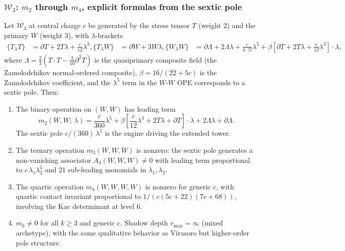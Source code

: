 \subsubsection{$\mathcal{W}_3$: $m_2$ through $m_4$,
explicit formulas from the sextic pole}

\begin{theorem}
Let $\mathcal{W}_3$ at central charge $c$ be generated by
the stress tensor $T$ (weight $2$) and the primary $W$
(weight $3$), with $\lambda$-brackets
\begin{align}
\{T{}_\lambda T\}
&= \partial T + 2T\lambda + \frac{c}{12}\lambda^3,
\{T{}_\lambda W\}
&= \partial W + 3W\lambda,
\{W{}_\lambda W\}
&= \partial\Lambda + 2\Lambda\lambda + \frac{c}{3\cdot 5!}\lambda^5
+ \beta\!\left[\partial T + 2T\lambda +
\frac{c}{12}\lambda^3\right] \cdot \lambda,
\end{align}
where $\Lambda = \frac{2}{3}(T \cdot T - \frac{3}{10}\partial^2 T)$
is the quasiprimary composite field (the Zamolodchikov
normal-ordered composite), $\beta = 16/(22 + 5c)$ is the
Zamolodchikov coefficient, and the $\lambda^5$ term in the
$W$-$W$ OPE corresponds to a sextic pole.
Then:
\begin{enumerate}[label=\textup{(\roman*)}]
\item The binary operation on $(W, W)$ has leading
term
\begin{equation}%
m_2(W,W;\, \lambda)
= \frac{c}{360}\lambda^5
+ \beta\!\left[\frac{c}{12}\lambda^3 + 2T\lambda
+ \partial T\right] \cdot \lambda
+ 2\Lambda\lambda + \partial\Lambda.
\end{equation}
The sextic pole $c/(360)\,\lambda^5$ is the
engine driving the extended tower.

\item The ternary operation $m_3(W,W,W)$ is nonzero:
the sextic pole generates a non-vanishing associator
$A_3(W,W,W) \ne 0$ with leading term proportional
to $c\,\lambda_1\lambda_2^5$ and $21$ sub-leading
monomials in $\lambda_1, \lambda_2$.

\item The quartic operation $m_4(W,W,W,W)$ is nonzero
for generic $c$, with quartic contact invariant
proportional to $1/(c(5c+22)(7c+68))$, involving
the Kac determinant at level $6$.

\item $m_k \ne 0$ for all $k \ge 3$ and generic $c$.
Shadow depth $r_{\max} = \infty$ (mixed archetype),
with the same qualitative behavior as Virasoro but
higher-order pole structure.
\end{enumerate}
\end{theorem}

